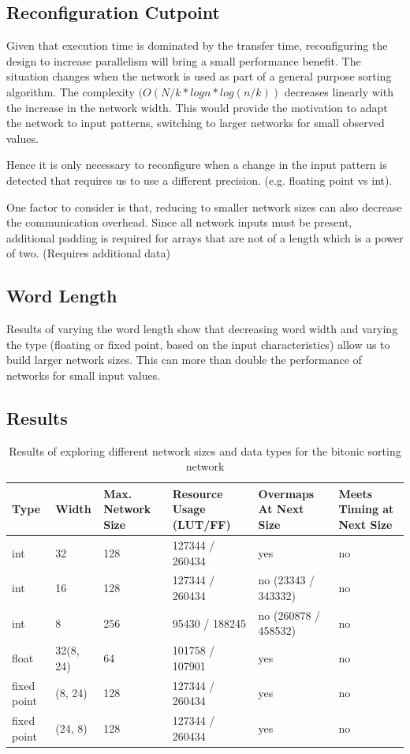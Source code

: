 \subsection{Reconfiguration Cutpoint}

Given that execution time is dominated by the transfer time,
reconfiguring the design to increase parallelism will bring a small
performance benefit.  The situation changes when the network is used
as part of a general purpose sorting algorithm. The complexity $( O(N/k
* logn * log(n/k)) $ decreases linearly with the increase in the network
width. This would provide the motivation to adapt the network to input
patterns, switching to larger networks for small observed values.

Hence it is only necessary to reconfigure when a change in the input
pattern is detected that requires us to use a different
precision. (e.g. floating point vs int).

One factor to consider is that, reducing to smaller network sizes can
also decrease the communication overhead. Since all network inputs
must be present, additional padding is required for arrays that are
not of a length which is a power of two. (Requires additional data)


\subsection{Word Length}

Results of varying the word length show that decreasing word width and
varying the type (floating or fixed point, based on the input
characteristics) allow us to build larger network sizes. This can more
than double the performance of networks for small input values.

\subsection{Results}

\begin{table}[!ht]
  \begin{tabularx}{\textwidth}{X | X | X | X | X | X}
    \hline
    Type & Width & Max. Network Size & Resource Usage (LUT/FF) & Overmaps At Next Size & Meets Timing at Next Size \\
    \hline
    \hline
    int & 32 & 128 & 127344 / 260434 & yes & no \\
    \hline
    int & 16 & 128 & 127344 / 260434 & no (23343 / 343332) & no \\
    \hline
    int & 8 & 256 & 95430 / 188245 & no (260878 / 458532) & no \\
    \hline
    float & 32(8, 24) & 64 & 101758 / 107901 & yes & no \\
    \hline
    fixed point & (8, 24) & 128 & 127344 / 260434 & yes & no \\
    \hline
    fixed point & (24, 8) & 128 & 127344 / 260434 & yes & no \\
  \end{tabularx}
  \caption{Results of exploring different network sizes and data types for the bitonic sorting network}
\end{table}

